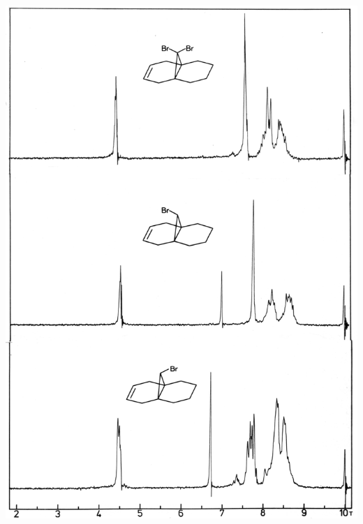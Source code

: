 \documentclass[a4paper,11pt]{article}
\begin{document}
\hspace*{-0.25cm}\includegraphics[width=14.42cm]{NMR_022}
\end{document}
